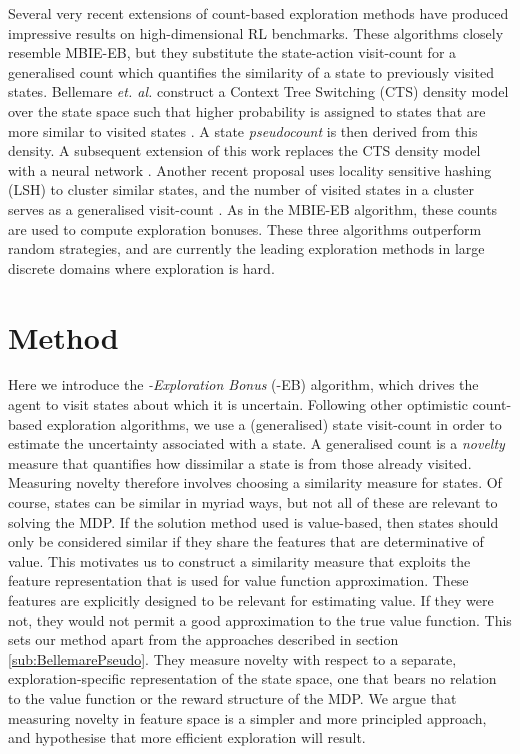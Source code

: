\documentclass{article}
\theoremstyle{definition}
\theoremstyle{definition}
\theoremstyle{plain}
\theoremstyle{plain}
\theoremstyle{plain}
\begin{document}
Several very recent extensions of count-based exploration methods
have produced impressive results on high-dimensional RL benchmarks.
These algorithms closely resemble MBIE-EB, but they substitute the
state-action visit-count for a generalised count which quantifies
the similarity of a state to previously visited states. Bellemare
\emph{et. al.} construct a Context Tree Switching (CTS) density model
over the state space such that higher probability is assigned to states
that are more similar to visited states \cite{Bellemare2016,veness2012context}.
A state \emph{pseudocount} is then derived from this density. A subsequent
extension of this work replaces the CTS density model with a neural
network \cite{DBLP:journals/corr/OstrovskiBOM17}. Another recent
proposal uses locality sensitive hashing (LSH) to cluster similar
states, and the number of visited states in a cluster serves as a
generalised visit-count \cite{Tang2016exploration}. As in the MBIE-EB
algorithm, these counts are used to compute exploration bonuses. These
three algorithms outperform random strategies, and are currently the
leading exploration methods in large discrete domains where exploration
is hard.


\section{Method}

Here we introduce the \emph{-Exploration Bonus }(-EB)
algorithm, which drives the agent to visit states about which it is
uncertain. Following other optimistic count-based exploration algorithms,
we use a (generalised) state visit-count in order to estimate the
uncertainty associated with a state. A generalised count is a \emph{novelty}
measure that quantifies how dissimilar a state is from those already
visited. Measuring novelty therefore involves choosing a similarity
measure for states. Of course, states can be similar in myriad ways,
but not all of these are relevant to solving the MDP. If the solution
method used is value-based, then states should only be considered
similar if they share the features that are determinative of value.
This motivates us to construct a similarity measure that exploits
the feature representation that is used for value function approximation.
These features are explicitly designed\emph{ }to be relevant for estimating
value. If they were not, they would not permit a good approximation
to the true value function. This sets our method apart from the approaches
described in section \ref{sub:BellemarePseudo}. They measure novelty
with respect to a separate, exploration-specific representation of
the state space, one that bears no relation to the value function
or the reward structure of the MDP. We argue that measuring novelty
in feature space is a simpler and more principled approach, and hypothesise
that more efficient exploration will result.
\end{document}
